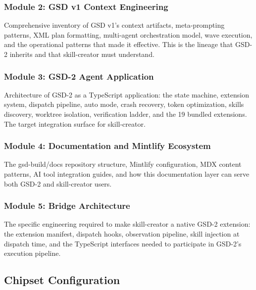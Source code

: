 \documentclass[11pt,letterpaper]{article}
\begin{document}
\subsubsection{Module 2: GSD v1 Context Engineering}
Comprehensive inventory of GSD v1's context artifacts, meta-prompting patterns, XML plan formatting, multi-agent orchestration model, wave execution, and the operational patterns that made it effective. This is the lineage that GSD-2 inherits and that skill-creator must understand.

\subsubsection{Module 3: GSD-2 Agent Application}
Architecture of GSD-2 as a TypeScript application: the state machine, extension system, dispatch pipeline, auto mode, crash recovery, token optimization, skills discovery, worktree isolation, verification ladder, and the 19 bundled extensions. The target integration surface for skill-creator.

\subsubsection{Module 4: Documentation and Mintlify Ecosystem}
The gsd-build/docs repository structure, Mintlify configuration, MDX content patterns, AI tool integration guides, and how this documentation layer can serve both GSD-2 and skill-creator users.

\subsubsection{Module 5: Bridge Architecture}
The specific engineering required to make skill-creator a native GSD-2 extension: the extension manifest, dispatch hooks, observation pipeline, skill injection at dispatch time, and the TypeScript interfaces needed to participate in GSD-2's execution pipeline.

\subsection{Chipset Configuration}
\end{document}
